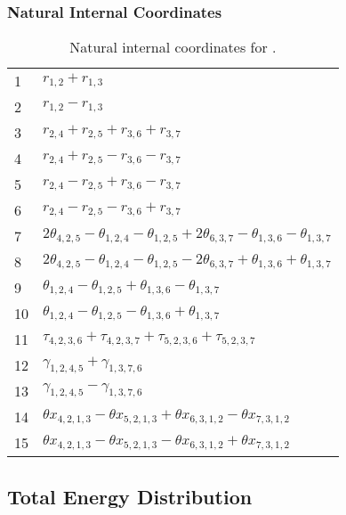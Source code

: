 \documentclass[10pt,oneside]{article}
\begin{document}
\begin{table}[h!]
\subsubsection*{Natural Internal Coordinates}
\centering
\caption{Natural internal coordinates for .}
\small
\begin{tabular}{ll}
\toprule
  1   & $r_{1,2} + r_{1,3}$ \\
  2   & $r_{1,2} - r_{1,3}$ \\
  3   & $r_{2,4} + r_{2,5} + r_{3,6} + r_{3,7}$ \\
  4   & $r_{2,4} + r_{2,5} - r_{3,6} - r_{3,7}$ \\
  5   & $r_{2,4} - r_{2,5} + r_{3,6} - r_{3,7}$ \\
  6   & $r_{2,4} - r_{2,5} - r_{3,6} + r_{3,7}$ \\
  7   & $2\theta_{4,2,5} - \theta_{1,2,4} - \theta_{1,2,5} + 2\theta_{6,3,7} - \theta_{1,3,6} - \theta_{1,3,7}$ \\
  8   & $2\theta_{4,2,5} - \theta_{1,2,4} - \theta_{1,2,5} - 2\theta_{6,3,7} + \theta_{1,3,6} + \theta_{1,3,7}$ \\
  9   & $\theta_{1,2,4} - \theta_{1,2,5} + \theta_{1,3,6} - \theta_{1,3,7}$ \\
  10  & $\theta_{1,2,4} - \theta_{1,2,5} - \theta_{1,3,6} + \theta_{1,3,7}$ \\
  11  & $\tau_{4,2,3,6} + \tau_{4,2,3,7} + \tau_{5,2,3,6} + \tau_{5,2,3,7}$ \\
  12  & $\gamma_{1,2,4,5} + \gamma_{1,3,7,6}$ \\
  13  & $\gamma_{1,2,4,5} - \gamma_{1,3,7,6}$ \\
  14  & $\theta x_{4,2,1,3} - \theta x_{5,2,1,3} + \theta x_{6,3,1,2} - \theta x_{7,3,1,2}$ \\
  15  & $\theta x_{4,2,1,3} - \theta x_{5,2,1,3} - \theta x_{6,3,1,2} + \theta x_{7,3,1,2}$ \\
\bottomrule
\end{tabular}
\end{table}

\begin{table}
\subsection*{Total Energy Distribution}
\centering\end{table}

\clearpage

\subsection{}
\end{document}
